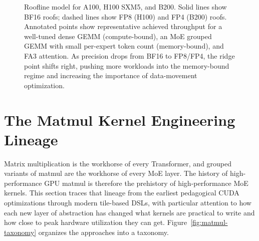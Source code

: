 \documentclass[10pt]{article}
\begin{document}
\begin{figure}[t]
\caption{Roofline model for A100, H100 SXM5, and B200. Solid lines show BF16 roofs; dashed lines show FP8 (H100) and FP4 (B200) roofs. Annotated points show representative achieved throughput for a well-tuned dense GEMM (compute-bound), an MoE grouped GEMM with small per-expert token count (memory-bound), and FA3 attention. As precision drops from BF16 to FP8/FP4, the ridge point shifts right, pushing more workloads into the memory-bound regime and increasing the importance of data-movement optimization.}
\label{fig:roofline}
\end{figure}

\section{The Matmul Kernel Engineering Lineage}
\label{sec:matmul}

Matrix multiplication is the workhorse of every Transformer, and grouped variants of matmul are the workhorse of every MoE layer. The history of high-performance GPU matmul is therefore the prehistory of high-performance MoE kernels. This section traces that lineage from the earliest pedagogical CUDA optimizations through modern tile-based DSLs, with particular attention to how each new layer of abstraction has changed what kernels are practical to write and how close to peak hardware utilization they can get. Figure~\ref{fig:matmul-taxonomy} organizes the approaches into a taxonomy.
\end{document}
